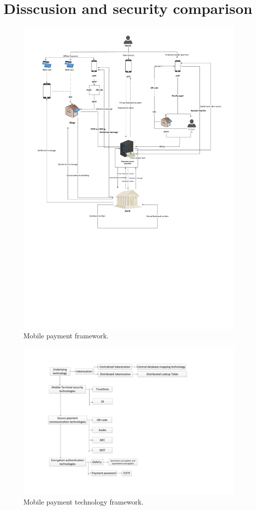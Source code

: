 \documentclass[journal]{IEEEtran}
\begin{document}
\section{Disscusion and security comparison}
\begin{figure}[htbp]
\centerline{\includegraphics[scale=0.48]{datu.pdf}}
\caption{Mobile payment framework.}
\label{fig}
\end{figure}


\begin{figure}[htbp]
\centerline{\includegraphics[scale=0.48]{tec.pdf}}
\caption{Mobile payment technology framework.}
\label{fig}
\end{figure}
\end{document}
